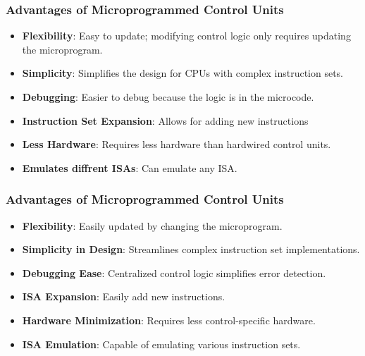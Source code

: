 \begin{frame}
    \frametitle{Advantages of Microprogrammed Control Units}
    \begin{itemize}
        \item \textbf{Flexibility}: Easy to update; modifying control
        logic only requires updating the microprogram.
        \item \textbf{Simplicity}: Simplifies the design for CPUs
        with complex instruction sets.
        \item \textbf{Debugging}: Easier to debug because the logic is in the microcode.
        \item \textbf{Instruction Set Expansion}: Allows for adding new instructions
        \item \textbf{Less Hardware}: Requires less hardware than hardwired control units.
        \item \textbf{Emulates diffrent ISAs}: Can emulate any ISA.
    \end{itemize}
\end{frame}

\begin{frame}
    \frametitle{Advantages of Microprogrammed Control Units}
    \begin{itemize}
        \item \textbf{Flexibility}: Easily updated by changing the microprogram.
        \item \textbf{Simplicity in Design}: Streamlines complex instruction set implementations.
        \item \textbf{Debugging Ease}: Centralized control logic simplifies error detection.
        \item \textbf{ISA Expansion}: Easily add new instructions.
        \item \textbf{Hardware Minimization}: Requires less control-specific hardware.
        \item \textbf{ISA Emulation}: Capable of emulating various instruction sets.
    \end{itemize}
\end{frame}

